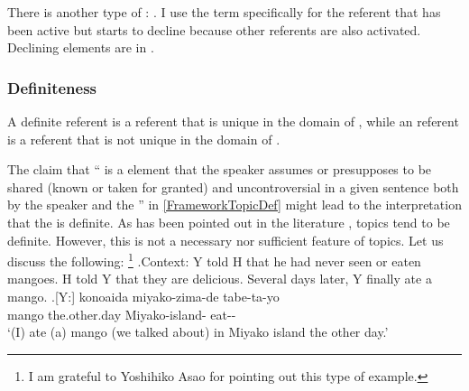 There is another type of : .
I use the term  specifically for the referent that has been active but starts to decline because other referents are also activated.
Declining elements are in .

\subsubsection{Definiteness}\label{Fr:Definition:TFFeathers:Definite}

A definite referent is a referent
that is unique in the domain of ,
while an  referent is a referent
that is not unique in the domain of .

The claim that `` is a  element that the speaker assumes or presupposes to be shared (known or taken for granted) and uncontroversial in a given sentence both by the speaker and the '' in \ref{FrameworkTopicDef} 
might lead to the interpretation that the  is definite.
As has been pointed out in the literature \cite{givon76,keenan76,comrie79,comrie83},
topics tend to be definite.
However, this is not a necessary nor sufficient feature of topics.
Let us discuss the following:
	\footnote{
	I am grateful to Yoshihiko Asao
	for pointing out this type of example.
	}
\ex.\label{Fr:Definition:TFFeathers:Definite:Ex:Mango1}Context:
	Y told H that he had never seen or eaten mangoes.
	H told Y that they are delicious.
	Several days later, Y finally ate a mango.
	\ag.[Y:]  konoaida miyako-zima-de tabe-ta-yo \\
			mango the.other.day Miyako-island- eat-- \\
			`(I) ate (a) mango (we talked about) in Miyako island the other day.'

